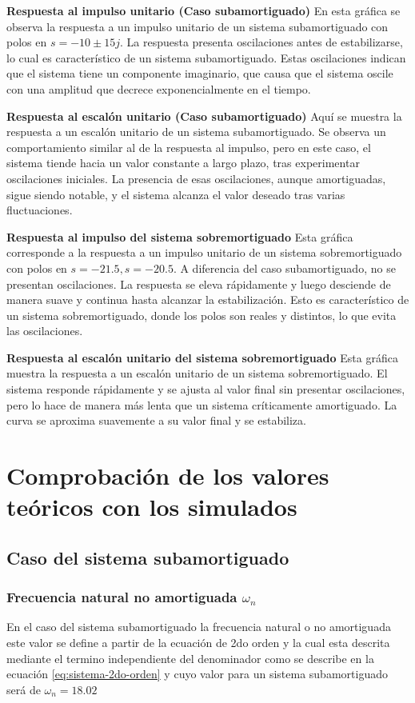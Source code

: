 \documentclass[conference]{IEEEtran}
\begin{document}
	\textbf{Respuesta al impulso unitario (Caso subamortiguado)}
	En esta gráfica se observa la respuesta a un impulso unitario de un sistema subamortiguado con polos en $s = -10 \pm 15j$. La respuesta presenta oscilaciones antes de estabilizarse, lo cual es característico de un sistema subamortiguado. Estas oscilaciones indican que el sistema tiene un componente imaginario, que causa que el sistema oscile con una amplitud que decrece exponencialmente en el tiempo.
	
	\textbf{Respuesta al escalón unitario (Caso subamortiguado)}
	Aquí se muestra la respuesta a un escalón unitario de un sistema subamortiguado. Se observa un comportamiento similar al de la respuesta al impulso, pero en este caso, el sistema tiende hacia un valor constante a largo plazo, tras experimentar oscilaciones iniciales. La presencia de esas oscilaciones, aunque amortiguadas, sigue siendo notable, y el sistema alcanza el valor deseado tras varias fluctuaciones.
	
	\textbf{Respuesta al impulso del sistema sobremortiguado}
	Esta gráfica corresponde a la respuesta a un impulso unitario de un sistema sobremortiguado con polos en 
	$ s = -21.5, s = -20.5$. A diferencia del caso subamortiguado, no se presentan oscilaciones. La respuesta se eleva rápidamente y luego desciende de manera suave y continua hasta alcanzar la estabilización. Esto es característico de un sistema sobremortiguado, donde los polos son reales y distintos, lo que evita las oscilaciones.
	
	\textbf{Respuesta al escalón unitario del sistema sobremortiguado}
	Esta gráfica muestra la respuesta a un escalón unitario de un sistema sobremortiguado. El sistema responde rápidamente y se ajusta al valor final sin presentar oscilaciones, pero lo hace de manera más lenta que un sistema críticamente amortiguado. La curva se aproxima suavemente a su valor final y se estabiliza.
	
	\section{Comprobación de los valores teóricos con los simulados}
	\subsection{Caso del sistema subamortiguado}
	\subsubsection{Frecuencia natural no amortiguada $\omega_n$}
	En el caso del sistema subamortiguado la frecuencia natural o no amortiguada este valor se define a partir de la ecuación de 2do orden y la cual esta descrita mediante el termino independiente del denominador como se describe en la ecuación \ref{eq:sistema-2do-orden} y cuyo valor para un sistema subamortiguado será de $\omega_n = 18.02$
	
\end{document}
